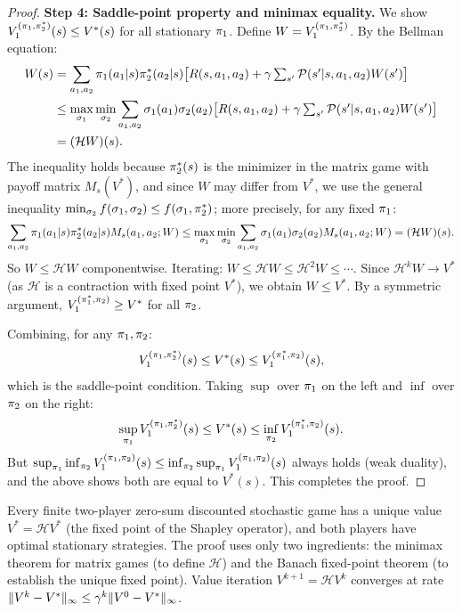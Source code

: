 \documentclass[11pt,a4paper]{article}
\begin{document}
\begin{proof}
\textbf{Step 4: Saddle-point property and minimax equality.}
We show $V_1^{(\pi_1, \pi_2^*)}(s) \leq V^*(s)$ for all
stationary $\pi_1$.  Define $W = V_1^{(\pi_1,\pi_2^*)}$.
By the Bellman equation:
\begin{align}
  W(s)
  &= \sum_{a_1,a_2} \pi_1(a_1|s)\pi_2^*(a_2|s)
    \bigl[R(s,a_1,a_2) + \gamma \textstyle\sum_{s'}
    \mathcal{P}(s'|s,a_1,a_2) W(s')\bigr] \\
  &\leq \max_{\sigma_1} \min_{\sigma_2}
    \sum_{a_1,a_2} \sigma_1(a_1)\sigma_2(a_2)
    \bigl[R(s,a_1,a_2) + \gamma \textstyle\sum_{s'}
    \mathcal{P}(s'|s,a_1,a_2) W(s')\bigr] \\
  &= (\mathcal{H} W)(s). \label{eq:W-leq-HW}
\end{align}
The inequality holds because $\pi_2^*(s)$ is the minimizer in
the matrix game with payoff matrix $M_s(V^*)$, and since $W$ may
differ from $V^*$, we use the general inequality
$\min_{\sigma_2} f(\sigma_1, \sigma_2) \leq f(\sigma_1,
\pi_2^*)$; more precisely, for any fixed $\pi_1$:
\[
  \sum_{a_1,a_2} \pi_1(a_1|s)\pi_2^*(a_2|s) M_s(a_1,a_2;W)
  \leq \max_{\sigma_1}\min_{\sigma_2}
  \sum_{a_1,a_2} \sigma_1(a_1)\sigma_2(a_2)M_s(a_1,a_2;W)
  = (\mathcal{H}W)(s).
\]
So $W \leq \mathcal{H}W$ componentwise.  Iterating: $W \leq
\mathcal{H}W \leq \mathcal{H}^2 W \leq \cdots$.  Since
$\mathcal{H}^k W \to V^*$ (as $\mathcal{H}$ is a contraction with
fixed point $V^*$), we obtain $W \leq V^*$.  By a symmetric argument,
$V_1^{(\pi_1^*, \pi_2)} \geq V^*$ for all $\pi_2$.

Combining, for any $\pi_1, \pi_2$:
\begin{equation}
  V_1^{(\pi_1, \pi_2^*)}(s) \leq V^*(s)
  \leq V_1^{(\pi_1^*, \pi_2)}(s),
\end{equation}
which is the saddle-point condition.  Taking $\sup$ over $\pi_1$
on the left and $\inf$ over $\pi_2$ on the right:
\begin{equation}
  \sup_{\pi_1} V_1^{(\pi_1, \pi_2^*)}(s)
  \leq V^*(s)
  \leq \inf_{\pi_2} V_1^{(\pi_1^*, \pi_2)}(s).
\end{equation}
But $\sup_{\pi_1}\inf_{\pi_2}
V_1^{(\pi_1,\pi_2)}(s) \leq
\inf_{\pi_2}\sup_{\pi_1}
V_1^{(\pi_1,\pi_2)}(s)$ always holds (weak duality), and
the above shows both are equal to $V^*(s)$.  This completes the
proof.
\end{proof}

\begin{keyresult}[title={Shapley's Theorem (1953)}]
Every finite two-player zero-sum discounted stochastic game has a
unique value $V^* = \mathcal{H}V^*$ (the fixed point of the Shapley
operator), and both players have optimal stationary strategies.  The
proof uses only two ingredients: the minimax theorem for matrix games
(to define $\mathcal{H}$) and the Banach fixed-point theorem (to
establish the unique fixed point).  Value iteration
$V^{k+1} = \mathcal{H}V^k$ converges at rate
$\|V^k - V^*\|_\infty \leq \gamma^k \|V^0 - V^*\|_\infty$.
\end{keyresult}
\end{document}
